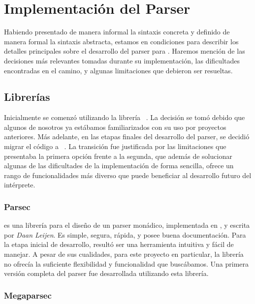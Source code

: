 \section{Implementación del Parser}

Habiendo presentado de manera informal la sintaxis concreta y definido de manera formal la sintaxis abstracta, estamos en condiciones para describir los detalles principales sobre el desarrollo del parser para \Lenguaje{}.
Haremos mención de las decisiones más relevantes tomadas durante su implementación, las dificultades encontradas en el camino, y algunas limitaciones que debieron ser resueltas.

\subsection{Librerías}

Inicialmente se comenzó utilizando la librería \Parsec{}~\cite{Parsec}.
La decisión se tomó debido que algunos de nosotros ya estábamos familiarizados con su uso por proyectos anteriores.
Más adelante, en las etapas finales del desarrollo del parser, se decidió migrar el código a \Megaparsec{}~\cite{Megaparsec}.
La transición fue justificada por las limitaciones que presentaba la primera opción frente a la segunda, que además de solucionar algunas de las dificultades de la implementación de forma sencilla, ofrece un rango de funcionalidades más diverso que puede beneficiar al desarrollo futuro del intérprete.

\subsubsection{Parsec}

\Parsec{} es una librería para el diseño de un parser monádico, implementada en \Haskell{}, y escrita por \textit{Daan Leijen}.
Es simple, segura, rápida, y posee buena documentación.
Para la etapa inicial de desarrollo, resultó ser una herramienta intuitiva y fácil de manejar.
A pesar de sus cualidades, para este proyecto en particular, la librería no ofrecía la suficiente flexibilidad y funcionalidad que buscábamos.
Una primera versión completa del parser fue desarrollada utilizando esta librería.

\subsubsection{Megaparsec}

